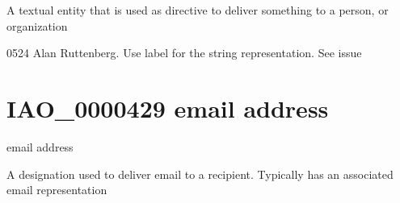 \documentclass[letterpaper,10pt,english]{sphinxmanual}
\begin{document}
\begin{sphinxShadowBox}

\sphinxAtStartPar
A textual entity that is used as directive to deliver something to a person, or organization
\end{sphinxShadowBox}

\begin{sphinxShadowBox}

\sphinxhyphen{}05\sphinxhyphen{}24 Alan Ruttenberg. Use label for the string representation. See issue 
\end{sphinxShadowBox}

\begin{sphinxShadowBox}

\sphinxAtStartPar
{}
\end{sphinxShadowBox}
\begin{quote}
\label{\detokenize{doc-IAO_0000429:iao-0000429}}\label{\detokenize{doc-IAO_0000429:email-address}}\label{\detokenize{doc-IAO_0000429:iao-0000429}}
\ignorespaces \end{quote}


\section{IAO\_0000429 \sphinxhyphen{} email address}
\label{\detokenize{doc-IAO_0000429:iao-0000429-email-address}}\label{\detokenize{doc-IAO_0000429:index-0}}\label{\detokenize{doc-IAO_0000429::doc}}
\begin{sphinxShadowBox}

\sphinxAtStartPar
email address
\end{sphinxShadowBox}

\begin{sphinxShadowBox}

\sphinxAtStartPar
A designation used to deliver email to a recipient.  Typically has an associated email representation
\end{sphinxShadowBox}
\end{document}
